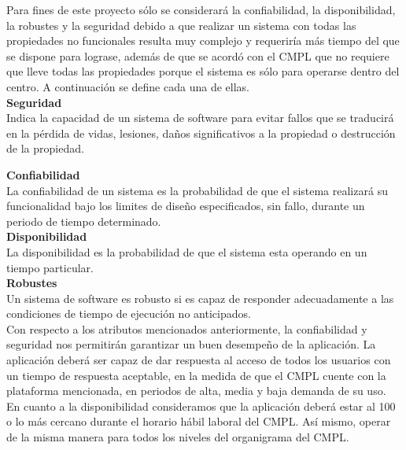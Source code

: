 Para fines de este proyecto sólo se considerará la confiabilidad, la disponibilidad, la robustes y la seguridad debido a que realizar un sistema con todas las propiedades no funcionales resulta muy complejo y requeriría más tiempo del que se dispone para lograse, además de que se acordó con el CMPL que no requiere que lleve todas las propiedades porque el sistema es sólo para operarse dentro del centro. A continuación se define cada una de ellas. \\ %

\textbf{Seguridad\\}
Indica la capacidad de un sistema de software para evitar fallos que se traducirá en la pérdida de vidas, lesiones, daños significativos a la propiedad o destrucción de la propiedad\cite{Seguridad}.

\textbf{Confiabilidad\\}
La confiabilidad de un sistema es la probabilidad de que el sistema realizará su funcionalidad bajo los limites de diseño especificados, sin fallo, durante un periodo de tiempo determinado\cite{Seguridad}.\\

\textbf{Disponibilidad\\}
La disponibilidad es la probabilidad de que el sistema esta operando en un tiempo particular\cite{Seguridad}.\\ 

\textbf{Robustes\\}
Un sistema de software es robusto si es capaz de responder adecuadamente a las condiciones de tiempo de ejecución no anticipados\cite{Seguridad}.\\

Con respecto a los atributos mencionados anteriormente, la confiabilidad y seguridad nos permitirán garantizar un buen desempeño de la aplicación. La aplicación deberá ser capaz de dar respuesta al acceso de todos los usuarios con un tiempo de respuesta aceptable, en la medida de que el CMPL cuente con la plataforma mencionada, en periodos de alta, media y baja demanda de su uso.\\

En cuanto a la disponibilidad consideramos que la aplicación deberá estar al 100 o lo más cercano durante el horario hábil laboral del CMPL. Así mismo, operar de la misma manera para todos los niveles del organigrama del CMPL.\\


